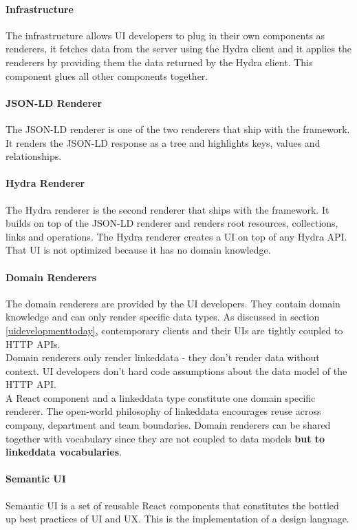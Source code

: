 \paragraph{Infrastructure}
The infrastructure allows UI developers to plug in their own components as renderers, it fetches data from the server using the Hydra client and it applies the renderers by providing them the data returned by the Hydra client. This component glues all other components together.

\paragraph{JSON-LD Renderer}
The JSON-LD renderer is one of the two renderers that ship with the framework. It renders the JSON-LD response as a tree and highlights keys, values and relationships.

\paragraph{Hydra Renderer}
The Hydra renderer is the second renderer that ships with the framework. It builds on top of the JSON-LD renderer and renders root resources, collections, links and operations. The Hydra renderer creates a UI on top of any Hydra API. That UI is not optimized because it has no domain knowledge.

\paragraph{Domain Renderers}
The domain renderers are provided by the UI developers. They contain domain knowledge and can only render specific data types. As discussed in section \ref{uidevelopmenttoday}, contemporary clients and their UIs are tightly coupled to HTTP APIs. \\
Domain renderers only render \gls{linkeddata} - they don't render data without context. UI developers don't hard code assumptions about the data model of the HTTP API. \\
A React component and a \gls{linkeddata} type constitute one domain specific renderer. The open-world philosophy of \gls{linkeddata} encourages reuse across company, department and team boundaries. Domain renderers can be shared together with vocabulary since they are not coupled to data models \textbf{but to \gls{linkeddata} vocabularies}.

\paragraph{Semantic UI}
Semantic UI is a set of reusable React components that constitutes the bottled up best practices of UI and UX. This is the implementation of a design language.

